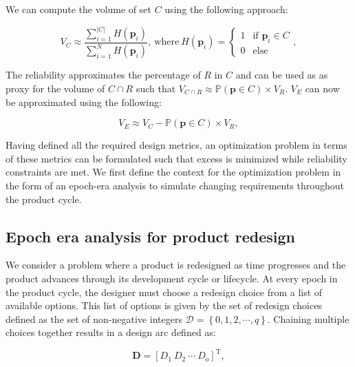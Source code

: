 We can compute the volume of set $C$ using the following approach:

\begin{equation} \label{eq:Cmontecarlo}
	V_C \approx \dfrac{\sum\limits_{i=1}^{|{C}|} H\left(\mathbf{p}_i\right)}{\sum\limits_{i=1}^{N} H\left(\mathbf{p}_i\right)}, ~\mathrm{where}~ H\left(\mathbf{p}_i\right)={\begin{cases}1&{\text{if }}\mathbf{p}_i\in C\\0&{\text{else}}\end{cases}},
\end{equation}

The reliability approximates the percentage of $R$ in $C$ and can be used as as proxy for the volume of $C\cap R$ such that $V_{C\cap R} \approx \mathbb{P}(\mathbf{p} \in C) \times V_R$. $V_E$ can now be approximated using the following:

\begin{equation} \label{eq:excesssimple}
	V_E \approx V_C - \mathbb{P}(\mathbf{p} \in C) \times V_R,
\end{equation}

Having defined all the required design metrics, an optimization problem in terms of these metrics can be formulated such that excess is minimized while reliability constraints are met. We first define the context for the optimization problem in the form of an epoch-era analysis to simulate changing requirements throughout the product cycle.

\subsection{Epoch era analysis for product redesign} \label{subsec:epochera}

We consider a problem where a product is redesigned as time progresses and the product advances through its development cycle or lifecycle. At every epoch in the product cycle, the designer must choose a redesign choice from a list of available options. This list of options is given by the set of redesign choices defined as the set of non-negative integers $\mathcal{D} = \left\{0,1,2,\cdots,q\right\}$. Chaining multiple choices together results in a design arc defined as:

\begin{equation} \label{eq:designarc}
	\mathbf{D} = \left[D_1 ~ D_2 ~ \cdots ~ D_o\right]^{\mathrm{T}},
\end{equation}

